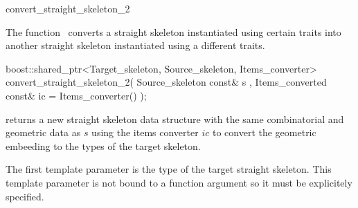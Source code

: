 

\begin{ccRefFunction}{convert_straight_skeleton_2}


\ccDefinition

The function \ccRefName\ converts a straight skeleton instantiated using certain traits into another straight skeleton instantiated using a different traits.


\ccFunction
{boost::shared_ptr<Target_skeleton, Source_skeleton, Items_converter>
 convert_straight_skeleton_2( Source_skeleton const& s
                            , Items_converted const& ic = Items_converter()
                            );
}
{ returns a new straight skeleton data structure with the same combinatorial and geometric data as $s$ using the items converter $ic$ to convert the geometric embeeding to the types of the target skeleton.

The first template parameter is the type of the target straight skeleton. This template parameter is not bound to a function argument so it must be explicitely specified.
}

\ccSeeAlso
{}\\
\\
\\

\end{ccRefFunction}


